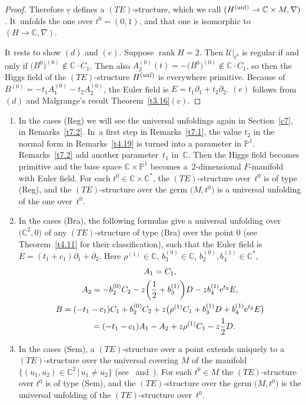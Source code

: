 \documentclass[10pt,a4paper]{amsart}
\numberwithin{equation}{section}
\numberwithin{figure}{section}
\newcommand{\C}{{\mathbb C}}
\renewcommand{\P}{{\mathbb P}}
\newcommand{\UU}{{\mathcal U}}
\newcommand{\uuuu}{\underline}
\newcommand{\paa}{\partial}
\newcommand{\nnn}{\nabla}
\DeclareMathOperator{\rank}{rank}
\begin{document}
\begin{proof}
Therefore $\uuuu{v}$ defines a $(TE)$-structure,
which we call $(H^{\rm (unf)}\to\C\times M,\nnn)$. It~unfolds the one over $t^0=(0,1)$,
and that one is isomorphic to $(H\to\C,\nnn)$.

It rests to show $(d)$ and $(e)$.
Suppose $\rank H=2$.
Then $\UU|_{t^0}$ is regular if and only if
$\big(B^0\big)^{(0)}\notin \C\cdot C_1$.
Then also $A_2^{(0)}(t)=-\big(B^0\big)^{(0)}\notin\C\cdot C_1$,
so then the Higgs field of the $(TE)$-structure $H^{\rm (unf)}$
is everywhere primitive.
Because of $B^{(0)}=-t_1A_1^{(0)}-t_2A_2^{(0)}$,
the Euler field is $E=t_1\paa_1+t_2\paa_2$.
$(e)$ follows from $(d)$ and Malgrange's result
Theorem~\ref{t3.16}$(c)$.
\end{proof}


\begin{Remarks}\label{t5.3}\qquad
\begin{enumerate}\itemsep=0pt
\item[$(i)$] In the cases (Reg) we will see the universal unfoldings
again in Section~\ref{c7}, in Remarks~\ref{t7.2}. In~a first step in Remarks~\ref{t7.1}, the value $t_2$
in the normal form in Remarks~\ref{t4.19} is
turned into a parameter in $\P^1$.
Remarks~\ref{t7.2} add another parameter~$t_1$ in~$\C$.
Then the Higgs field becomes primitive and
the base space $\C\times\P^1$
becomes a~2-dimensional $F$-manifold with Euler field.
For each $t^0\in\C\times\C^*$, the $(TE)$-structure over~$t^0$
is of type (Reg), and the $(TE)$-structure over the
germ $\big(M,t^0\big)$ is a universal unfolding of the one over~$t^0$.

\item[$(ii)$] In the cases (Bra), the following formulas give
a universal unfolding over $\big(\C^2,0\big)$ of any $(TE)$-structure
of type (Bra) over the point 0 (see Theorem~\ref{t4.11} for
their classification), such that the Euler field
is $E=(t_1+c_1)\paa_1+\paa_2$. Here $\rho^{(1)}\in\C$,
$b_3^{(0)}\in\C$, $b_2^{(0)},b_4^{(1)}\in\C^*$,
\begin{gather*}%
A_1= C_1,
\\
A_2= -b_2^{(0)}C_2 -z\bigg(\frac{1}{2}+b_3^{(1)}\bigg)D
- z b_4^{(1)}{\rm e}^{t_2}E,%
\\
B= (-t_1-c_1)C_1+b_2^{(0)}C_2 + z\big(\rho^{(1)}C_1+b_3^{(1)}D+
b_4^{(1)}{\rm e}^{t_2}E\big)
\\ \hphantom{B}
{}= (-t_1-c_1)A_1 - A_2 + z\rho^{(1)}C_1-z\frac{1}{2}D.
\end{gather*}

\item[$(iii)$] In the cases (Sem), a $(TE)$-structure over a point
extends uniquely to a $(TE)$-structure over the
universal covering $M$ of the manifold
$\big\{(u_1,u_2)\in\C^2\,|\, u_1\neq u_2\big\}$ (see~\cite{Ma83b} and~\cite[Chapter~III, Theorem~2.10]{Sa02}).
For each $t^0\in M$ the $(TE)$-structure over $t^0$
is of type (Sem), and the $(TE)$-structure over the germ
$\big(M,t^0\big)$ is the universal unfolding of the $(TE)$-structure
over~$t^0$.
\end{enumerate}
\end{Remarks}
\end{document}
